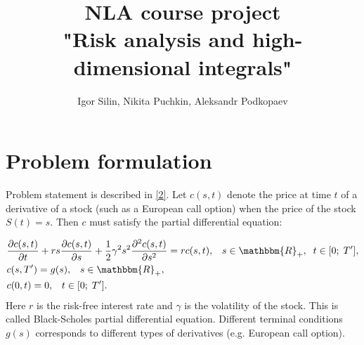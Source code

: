 \documentclass[11pt,a4paper]{extarticle}
\title{NLA course project \\
"Risk analysis and high-dimensional integrals"}
\author{Igor Silin, Nikita Puchkin, Aleksandr Podkopaev}
\begin{document}
\maketitle

\section{Problem formulation}

	Problem statement is described in  \href{http://www.columbia.edu/~ks20/FE-Notes/4700-07-Notes-GBM.pdf}{[2]}. Let $c(s, t)$ denote the price at time $t$ of a derivative of a stock (such as a European call option) when the price of the stock $S(t) = s$. Then $c$ must satisfy the partial differential equation: 

\begin{equation}
	\begin{aligned}
		&\frac{\partial c(s,t)}{\partial t} + rs \frac{\partial c(s,t)}{\partial s} + \frac12 \gamma^2 s^2 \frac{\partial^2 c(s,t)}{\partial s^2} = rc(s,t),
		\;\;\;s \in \mathbbm{R}_{+},\;\; t \in [0;\;T^{\prime}],\\
		&c(s,T^{\prime}) = g(s), \;\;\; s \in \mathbbm{R}_{+},\\
		&c(0,t) = 0, \;\;\; t \in [0;\;T^{\prime}].
	\end{aligned}
\end{equation}
Here  $r$ is the risk-free interest rate and $\gamma$ is the volatility of the stock.
This is called Black-Scholes partial differential equation. Different terminal conditions $g(s)$ corresponds to different types of derivatives (e.g. European call option).
\end{document}
